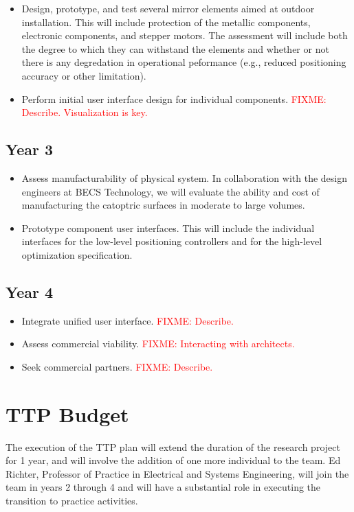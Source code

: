 \documentclass[11pt]{article}
\newcommand{\FIXME}[1]{\textcolor{red}{FIXME: #1}}
\begin{document}
\begin{itemize}

\item Design, prototype, and test several mirror elements aimed at
outdoor installation. This will include protection of the metallic components,
electronic components, and stepper motors.  The assessment will include
both the degree to which they can withstand the elements and whether or
not there is any degredation in operational peformance (e.g., reduced
positioning accuracy or other limitation).

\item Perform initial user interface design for individual components.
\FIXME{Describe. Visualization is key.}

\end{itemize}

\subsection{Year 3}

\begin{itemize}

\item Assess manufacturability of physical system.  In collaboration with
the design engineers at BECS Technology, 
we will evaluate the ability and cost of manufacturing the catoptric
surfaces in moderate to large volumes.

\item Prototype component user interfaces. This will include the individual
interfaces for the low-level positioning controllers 
and for the high-level optimization specification.

\end{itemize}

\subsection{Year 4}

\begin{itemize}

\item Integrate unified user interface. \FIXME{Describe.}

\item Assess commercial viability. \FIXME{Interacting with architects.}

\item Seek commercial partners. \FIXME{Describe.}

\end{itemize}

\section{TTP Budget}

The execution of the TTP plan will extend the duration of the research
project for 1 year, and will involve the addition of one more individual
to the team.  Ed Richter, Professor of Practice in Electrical and Systems
Engineering, will join the team in years 2 through 4 and will have a
substantial role in executing the transition to practice activities.
\end{document}
